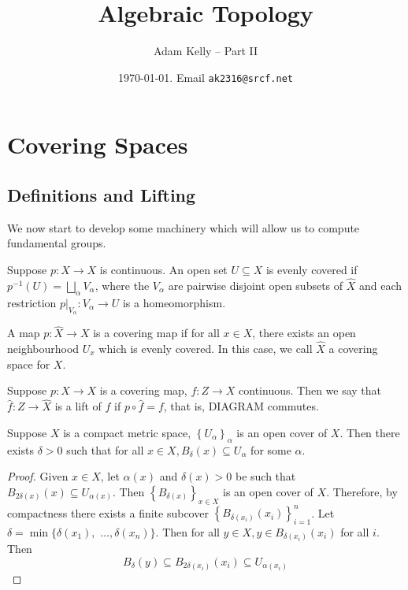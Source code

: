 \documentclass[a4paper, 10pt, twocolumn]{amsart}
\title{Algebraic Topology}
\author{Adam Kelly -- Part II}
\date{\today. Email \texttt{ak2316@srcf.net}}
\begin{document}
\maketitle

\section{Covering Spaces}

\subsection{Definitions and Lifting}

We now start to develop some machinery which will allow us to compute fundamental groups.

\begin{definition}
Suppose $p:\hat X\to X$ is continuous. An open set $U\subseteq X$ is evenly covered if $p^{-1}(U)=\bigsqcup_\alpha V_\alpha$, where the $V_\alpha$ are pairwise disjoint open subsets of $\hat X$ and each restriction $p|_{V_\alpha}:V_\alpha\to U$ is a homeomorphism.
\end{definition}

\begin{definition}
  A map $p: \hat{X} \rightarrow X$ is a covering map if for all $x \in X$, there exists an open neighbourhood $U_x$ which is evenly covered. In this case, we call $\hat{X}$ a covering space for $X$.
\end{definition}

\begin{definition}[Lift]
  Suppose $p: \hat{X} \rightarrow X$ is a covering map, $f: Z \rightarrow X$ continuous. Then we say that $\hat{f}: Z \rightarrow \hat{X}$ is a lift of $f$ if $p \circ \hat{f}=f$, that is,
  {\color{red} DIAGRAM}
  commutes.
\end{definition}

\begin{lemma}
Suppose $X$ is a compact metric space, $\left\{U_\alpha\right\}_\alpha$ is an open cover of $X$. Then there exists $\delta>0$ such that for all $x \in X, B_\delta(x) \subseteq U_\alpha$ for some $\alpha$.
\end{lemma}
\begin{proof}
  Given $x \in X$, let $\alpha(x)$ and $\delta(x)>0$ be such that $B_{2 \delta(x)}(x) \subseteq U_{\alpha(x)}$. Then $\left\{B_{\delta(x)}\right\}_{x \in X}$ is an open cover of $X$. Therefore, by compactness there exists a finite subcover $\left\{B_{\delta\left(x_i\right)}\left(x_i\right)\right\}_{i=1}^n$. Let $\delta=\min \{\delta\left(x_1\right),$ $\ldots, \delta\left(x_n\right)\}$. Then for all $y \in X, y \in B_{\delta\left(x_i\right)}\left(x_i\right)$ for all $i$. Then
  $$
  B_\delta(y) \subseteq B_{2 \delta\left(x_i\right)}\left(x_i\right) \subseteq U_{\alpha\left(x_i\right)}
  $$
\end{proof}
\end{document}
